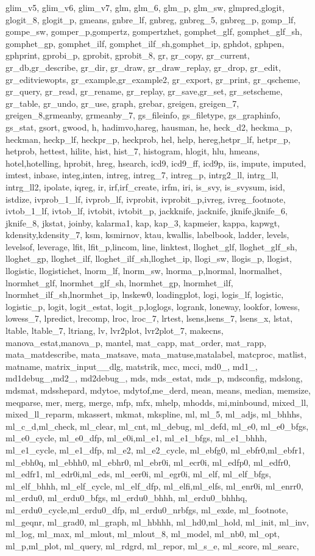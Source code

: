 {{glim_v5, glim_v6, glim_v7, glm, glm_6, glm_p, glm_sw, glmpred,glogit, glogit_8, glogit_p, gmeans, gnbre_lf, gnbreg, gnbreg_5, gnbreg_p, gomp_lf, gompe_sw, gomper_p,gompertz, gompertzhet, gomphet_glf, gomphet_glf_sh, gomphet_gp, gomphet_ilf, gomphet_ilf_sh,gomphet_ip, gphdot, gphpen, gphprint, gprobi_p, gprobit, gprobit_8, gr, gr_copy, gr_current, gr_db,gr_describe, gr_dir, gr_draw, gr_draw_replay, gr_drop, gr_edit, gr_editviewopts, gr_example,gr_example2, gr_export, gr_print, gr_qscheme, gr_query, gr_read, gr_rename, gr_replay, gr_save,gr_set, gr_setscheme, gr_table, gr_undo, gr_use, graph, grebar, greigen, greigen_7, greigen_8,grmeanby, grmeanby_7, gs_fileinfo, gs_filetype, gs_graphinfo, gs_stat, gsort, gwood, h, hadimvo,hareg, hausman, he, heck_d2, heckma_p, heckman, heckp_lf, heckpr_p, heckprob, hel, help, hereg,hetpr_lf, hetpr_p, hetprob, hettest, hilite, hist, hist_7, histogram, hlogit, hlu, hmeans, hotel,hotelling, hprobit, hreg, hsearch, icd9, icd9_ff, icd9p, iis, impute, imputed, imtest, inbase, integ,inten, intreg, intreg_7, intreg_p, intrg2_ll, intrg_ll, intrg_ll2, ipolate, iqreg, ir, irf,irf_create, irfm, iri, is_svy, is_svysum, isid, istdize, ivprob_1_lf, ivprob_lf, ivprobit, ivprobit_p,ivreg, ivreg_footnote, ivtob_1_lf, ivtob_lf, ivtobit, ivtobit_p, jackknife, jacknife, jknife,jknife_6, jknife_8, jkstat, joinby, kalarma1, kap, kap_3, kapmeier, kappa, kapwgt, kdensity,kdensity_7, ksm, ksmirnov, ktau, kwallis, labelbook, ladder, levels, levelsof, leverage, lfit, lfit_p,lincom, line, linktest, lloghet_glf, lloghet_glf_sh, lloghet_gp, lloghet_ilf, lloghet_ilf_sh,lloghet_ip, llogi_sw, llogis_p, llogist, llogistic, llogistichet, lnorm_lf, lnorm_sw, lnorma_p,lnormal, lnormalhet, lnormhet_glf, lnormhet_glf_sh, lnormhet_gp, lnormhet_ilf, lnormhet_ilf_sh,lnormhet_ip, lnskew0, loadingplot, logi, logis_lf, logistic, logistic_p, logit, logit_estat, logit_p,loglogs, logrank, loneway, lookfor, lowess, lowess_7, lpredict, lrecomp, lroc, lroc_7, lrtest, lsens,lsens_7, lsens_x, lstat, ltable, ltable_7, ltriang, lv, lvr2plot, lvr2plot_7, makecns, manova_estat,manova_p, mantel, mat_capp, mat_order, mat_rapp, mata_matdescribe, mata_matsave, mata_matuse,matalabel, matcproc, matlist, matname, matrix_input__dlg, matstrik, mcc, mcci, md0_, md1_, md1debug_,md2_, md2debug_, mds, mds_estat, mds_p, mdsconfig, mdslong, mdsmat, mdsshepard, mdytoe, mdytof,me_derd, mean, means, median, memsize, meqparse, mer, merg, merge, mfp, mfx, mhelp, mhodds, mi,minbound, mixed_ll, mixed_ll_reparm, mkassert, mkmat, mkspline, ml, ml_5, ml_adjs, ml_bhhhs, ml_c_d,ml_check, ml_clear, ml_cnt, ml_debug, ml_defd, ml_e0, ml_e0_bfgs, ml_e0_cycle, ml_e0_dfp, ml_e0i,ml_e1, ml_e1_bfgs, ml_e1_bhhh, ml_e1_cycle, ml_e1_dfp, ml_e2, ml_e2_cycle, ml_ebfg0, ml_ebfr0,ml_ebfr1, ml_ebh0q, ml_ebhh0, ml_ebhr0, ml_ebr0i, ml_ecr0i, ml_edfp0, ml_edfr0, ml_edfr1, ml_edr0i,ml_eds, ml_eer0i, ml_egr0i, ml_elf, ml_elf_bfgs, ml_elf_bhhh, ml_elf_cycle, ml_elf_dfp, ml_elfi,ml_elfs, ml_enr0i, ml_enrr0, ml_erdu0, ml_erdu0_bfgs, ml_erdu0_bhhh, ml_erdu0_bhhhq, ml_erdu0_cycle,ml_erdu0_dfp, ml_erdu0_nrbfgs, ml_exde, ml_footnote, ml_geqnr, ml_grad0, ml_graph, ml_hbhhh, ml_hd0,ml_hold, ml_init, ml_inv, ml_log, ml_max, ml_mlout, ml_mlout_8, ml_model, ml_nb0, ml_opt, ml_p,ml_plot, ml_query, ml_rdgrd, ml_repor, ml_s_e, ml_score, ml_searc, }}
